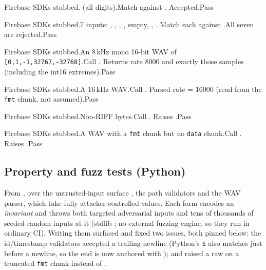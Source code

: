{Firebase SDKs stubbed.}{ (all digits).}{Match against .}
{Accepted.}{Pass}

{Firebase SDKs stubbed.}{7 inputs: , , , , empty, , .}
{Match each against .}{All seven are rejected.}{Pass}

{Firebase SDKs stubbed.}{An 8\,kHz mono 16-bit WAV of \texttt{[0,1,-1,32767,-32768]}.}{Call .}
{Returns rate 8000 and exactly those samples (including the int16 extremes).}{Pass}

{Firebase SDKs stubbed.}{A 16\,kHz WAV.}{Call .}
{Parsed rate = 16000 (read from the \texttt{fmt} chunk, not assumed).}{Pass}

{Firebase SDKs stubbed.}{Non-RIFF bytes.}{Call .}
{Raises .}{Pass}

{Firebase SDKs stubbed.}{A WAV with a \texttt{fmt} chunk but no \texttt{data} chunk.}{Call .}
{Raises .}{Pass}

\subsection{Property and fuzz tests (Python)}

From , over the untrusted-input surface , the path
validators and the WAV parser, which take fully attacker-controlled values. Each form encodes an
\emph{invariant} and throws both targeted adversarial inputs and tens of thousands of seeded-random
inputs at it (stdlib ; no external fuzzing engine, so they run in ordinary CI). Writing
them surfaced and fixed two issues, both pinned below: the id/timestamp validators accepted a trailing
newline (Python's \texttt{\$} also matches just before a newline, so the end is now anchored with
\tn{\Z}); and  raised a raw  on a truncated \texttt{fmt} chunk instead
of .


